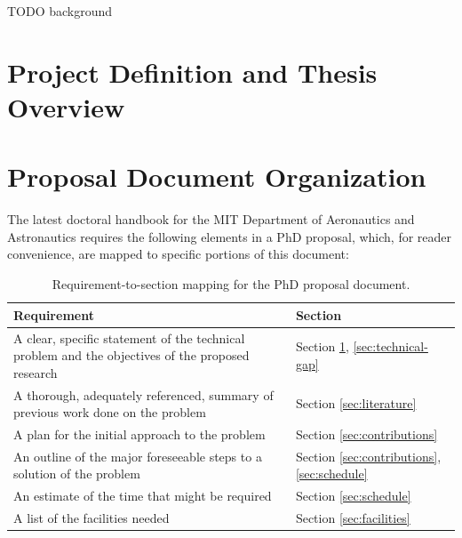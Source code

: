 \documentclass[12pt,vi,oneside]{report}
\begin{document}
    TODO background


    \section{Project Definition and Thesis Overview}
    \label{sec:definition}


    \section{Proposal Document Organization}

    The latest doctoral handbook for the MIT Department of Aeronautics and Astronautics requires the following elements in a PhD proposal, which, for reader convenience, are mapped to specific portions of this document:

    \begingroup
    \renewcommand{\arraystretch}{1.5} %
    \begin{table}[H]
        \centering
        \caption{Requirement-to-section mapping for the PhD proposal document.}
        \label{tab:toc}
        \begin{tabular}{p{10cm}|p{4cm}}
            Requirement                                                                                      & Section                                               \\
            \hline
            A clear, specific statement of the technical problem and the objectives of the proposed research & Section \ref{sec:definition}, \ref{sec:technical-gap} \\
            A thorough, adequately referenced, summary of previous work done on the problem                  & Section \ref{sec:literature}                          \\
            A plan for the initial approach to the problem                                                   & Section \ref{sec:contributions}                       \\
            An outline of the major foreseeable steps to a solution of the problem                           & Section \ref{sec:contributions}, \ref{sec:schedule}   \\
            An estimate of the time that might be required                                                   & Section \ref{sec:schedule}                            \\
            A list of the facilities needed                                                                  & Section \ref{sec:facilities}                          \\
        \end{tabular}
    \end{table}
    \endgroup
\end{document}

